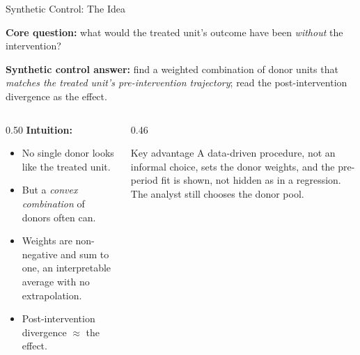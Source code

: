 \documentclass[main.tex]{subfiles}
\begin{document}
\begin{frame}{Synthetic Control: The Idea}

  \textbf{Core question:} what would the treated unit's outcome have been
  \emph{without} the intervention?

  \bigskip
  \textbf{Synthetic control answer:} find a weighted combination of donor units
  that \emph{matches the treated unit's pre-intervention trajectory}; read the
  post-intervention divergence as the effect.

  \begin{columns}[T]
    \begin{column}{0.50\textwidth}
      \textbf{Intuition:}
      \begin{itemize}
        \item No single donor looks like the treated unit.
        \item But a \emph{convex combination} of donors often can.
        \item Weights are non-negative and sum to one, an interpretable
          average with no extrapolation.
        \item Post-intervention divergence $\approx$ the effect.
      \end{itemize}
    \end{column}
    \begin{column}{0.46\textwidth}
      \begin{exampleblock}{Key advantage}
        A data-driven procedure, not an informal choice, sets the donor
        weights, and the pre-period fit is shown, not hidden as in a
        regression. The analyst still chooses the donor pool.
      \end{exampleblock}
    \end{column}
  \end{columns}

\end{frame}
\end{document}
